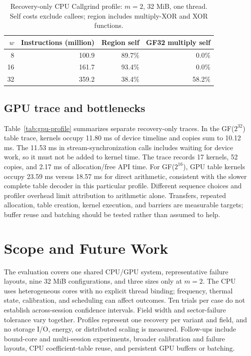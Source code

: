 \documentclass[conference]{IEEEtran}
\begin{document}
\begin{table}[t]
\caption{Recovery-only CPU Callgrind profile: $m=2$, 32 MiB, one thread. Self costs exclude callees; region includes multiply-XOR and XOR functions.}
\label{tab:cpu-profile}
\centering
\footnotesize
\begin{tabular}{rrrr}
\hline
$w$ & Instructions (million) & Region self & GF32 multiply self\\
\hline
8&100.9&89.7\%&0.0\%\\
16&161.7&93.4\%&0.0\%\\
32&359.2&38.4\%&58.2\%\\
\hline
\end{tabular}
\end{table}

\subsection{GPU trace and bottlenecks}
Table~\ref{tab:gpu-profile} summarizes separate recovery-only traces. In the GF($2^{32}$) table trace, kernels occupy 11.80 ms of device timeline and copies sum to 10.12 ms. The 11.53 ms in stream-synchronization calls includes waiting for device work, so it must not be added to kernel time. The trace records 17 kernels, 52 copies, and 2.17 ms of allocation/free API time. For GF($2^{16}$), GPU table kernels occupy 23.59 ms versus 18.57 ms for direct arithmetic, consistent with the slower complete table decoder in this particular profile. Different sequence choices and profiler overhead limit attribution to arithmetic alone. Transfers, repeated allocation, table creation, kernel execution, and barriers are measurable targets; buffer reuse and batching should be tested rather than assumed to help.

\section{Scope and Future Work}
The evaluation covers one shared CPU/GPU system, representative failure layouts, nine 32 MiB configurations, and three sizes only at $m=2$. The CPU uses heterogeneous cores with no explicit thread binding; frequency, thermal state, calibration, and scheduling can affect outcomes. Ten trials per case do not establish across-session confidence intervals. Field width and sector-failure tolerance vary together. Profiles represent one recovery per variant and field, and no storage I/O, energy, or distributed scaling is measured. Follow-ups include bound-core and multi-session experiments, broader calibration and failure layouts, CPU coefficient-table reuse, and persistent GPU buffers or batching.
\end{document}
